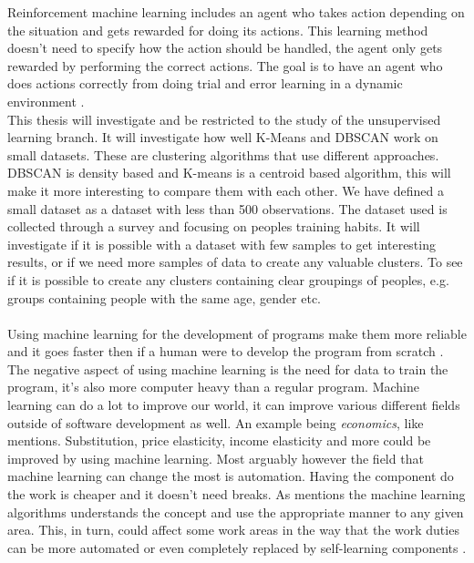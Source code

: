 \documentclass[a4paper]{article}
\begin{document}
Reinforcement machine learning includes an agent who takes action depending on the situation and gets rewarded for doing its actions. This learning method doesn't need to specify how the action should be handled, the agent only gets rewarded by performing the correct actions. The goal is to have an agent who does actions correctly from doing trial and error learning in a dynamic environment \cite{reinforcement}. \newline\\
% 
% 
This thesis will investigate and be restricted to the study of the unsupervised learning branch. It 
will investigate how well K-Means and DBSCAN work on small datasets. These are clustering 
algorithms that use different approaches.  DBSCAN is density based and K-means is a centroid based 
algorithm, this will make it more interesting to compare them with each other. We have defined a 
small dataset as a dataset with less than 500 observations. The dataset used is collected through a 
survey and focusing on peoples training habits. It will investigate if it is possible with a 
dataset with few samples to get interesting results, or if we need more samples of data to create 
any valuable clusters. To see if it is possible to create any clusters containing clear groupings 
of peoples, e.g. groups containing people with the same age, gender etc. \\\\
Using machine learning for the development of programs make them more reliable and it goes faster 
then if a human were to develop the program from scratch \cite{ImportanceML}. The negative aspect 
of using machine learning is the need for data to train the program, it's also more computer heavy 
than a regular program. Machine learning can do a lot to improve our world,  it can improve various 
different fields outside of software development as well. An example being \textit{economics}, like 
\cite{ImportanceML} mentions.  Substitution, price elasticity, income elasticity and more could be 
improved by using machine learning. Most arguably however the field that machine learning can 
change the most is automation. Having the component do the work is cheaper and it doesn't need 
breaks. As \cite{soni2017review} mentions the machine learning algorithms understands the concept 
and use the appropriate manner to any given area. This, in turn, could affect some work areas in 
the way that the work duties can be more automated or even completely replaced by self-learning 
components \cite{Automation}.
\end{document}

